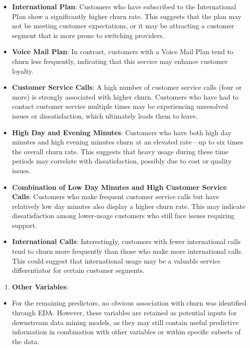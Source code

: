 \documentclass[
]{book}
\providecommand{\tightlist}{%
  \setlength{\itemsep}{0pt}\setlength{\parskip}{0pt}}
\theoremstyle{definition}
\theoremstyle{definition}
\theoremstyle{definition}
\theoremstyle{definition}
\theoremstyle{remark}
\begin{document}
\begin{itemize}
\tightlist
\item
  \textbf{International Plan}: Customers who have subscribed to the International Plan show a significantly higher churn rate. This suggests that the plan may not be meeting customer expectations, or it may be attracting a customer segment that is more prone to switching providers.
\item
  \textbf{Voice Mail Plan}: In contrast, customers with a Voice Mail Plan tend to churn less frequently, indicating that this service may enhance customer loyalty.
\item
  \textbf{Customer Service Calls}: A high number of customer service calls (four or more) is strongly associated with higher churn. Customers who have had to contact customer service multiple times may be experiencing unresolved issues or dissatisfaction, which ultimately leads them to leave.
\item
  \textbf{High Day and Evening Minutes}: Customers who have both high day minutes and high evening minutes churn at an elevated rate---up to six times the overall churn rate. This suggests that heavy usage during these time periods may correlate with dissatisfaction, possibly due to cost or quality issues.
\item
  \textbf{Combination of Low Day Minutes and High Customer Service Calls}: Customers who make frequent customer service calls but have relatively low day minutes also display a higher churn rate. This may indicate dissatisfaction among lower-usage customers who still face issues requiring support.
\item
  \textbf{International Calls}: Interestingly, customers with fewer international calls tend to churn more frequently than those who make more international calls. This could suggest that international usage may be a valuable service differentiator for certain customer segments.
\end{itemize}

\begin{enumerate}
\def\labelenumi{\arabic{enumi}.}
\setcounter{enumi}{2}
\tightlist
\item
  \textbf{Other Variables}:
\end{enumerate}

\begin{itemize}
\tightlist
\item
  For the remaining predictors, no obvious association with churn was identified through EDA. However, these variables are retained as potential inputs for downstream data mining models, as they may still contain useful predictive information in combination with other variables or within specific subsets of the data.
\end{itemize}
\end{document}
